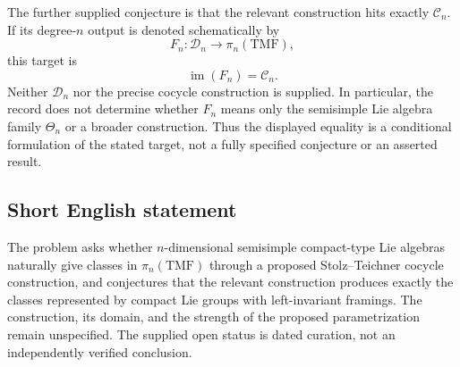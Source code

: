 \documentclass[11pt]{article}
\begin{document}
The further supplied conjecture is that the relevant construction hits exactly \(\mathcal C_n\). If its degree-\(n\) output is denoted schematically by
\[
F_n:\mathcal D_n\longrightarrow\pi_n(\mathrm{TMF}),
\]
this target is
\[
\operatorname{im}(F_n)=\mathcal C_n.
\]
Neither \(\mathcal D_n\) nor the precise cocycle construction is supplied. In particular, the record does not determine whether \(F_n\) means only the semisimple Lie algebra family \(\Theta_n\) or a broader construction. Thus the displayed equality is a conditional formulation of the stated target, not a fully specified conjecture or an asserted result.
\subsection{Short English statement}
The problem asks whether \(n\)-dimensional semisimple compact-type Lie algebras naturally give classes in \(\pi_n(\mathrm{TMF})\) through a proposed Stolz--Teichner cocycle construction, and conjectures that the relevant construction produces exactly the classes represented by compact Lie groups with left-invariant framings. The construction, its domain, and the strength of the proposed parametrization remain unspecified. The supplied open status is dated curation, not an independently verified conclusion.
\end{document}
